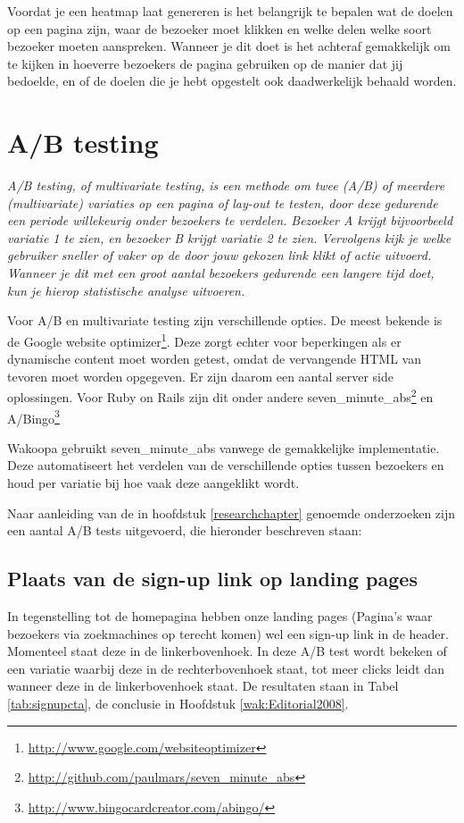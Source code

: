 \documentclass[a4paper, 10pt, pdftex]{report}
\begin{document}
    Voordat je een heatmap laat genereren is het belangrijk te bepalen wat de doelen op een pagina zijn, waar de bezoeker moet klikken en welke delen welke soort bezoeker moeten aanspreken. Wanneer je dit doet is het achteraf gemakkelijk om te kijken in hoeverre bezoekers de pagina gebruiken op de manier dat jij bedoelde, en of de doelen die je hebt opgestelt ook daadwerkelijk behaald worden.

    \section{A/B testing}
    \textit{A/B testing, of multivariate testing, is een methode om twee (A/B) of meerdere (multivariate) variaties op een pagina of lay-out te testen, door deze gedurende een periode willekeurig onder bezoekers te verdelen. Bezoeker \emph{A} krijgt bijvoorbeeld variatie 1 te zien, en bezoeker \emph{B} krijgt variatie 2 te zien. Vervolgens kijk je welke gebruiker sneller of vaker op de door jouw gekozen link klikt of actie uitvoerd. Wanneer je dit met een groot aantal bezoekers gedurende een langere tijd doet, kun je hierop statistische analyse uitvoeren.}

    Voor A/B en multivariate testing zijn verschillende opties. De meest bekende is de Google website optimizer\footnote{\url{http://www.google.com/websiteoptimizer}}. Deze zorgt echter voor beperkingen als er dynamische content moet worden getest, omdat de vervangende HTML van tevoren moet worden opgegeven. Er zijn daarom een aantal server side oplossingen. Voor Ruby on Rails zijn dit onder andere seven\_minute\_abs\footnote{\url{http://github.com/paulmars/seven\_minute\_abs}} en A/Bingo\footnote{\url{http://www.bingocardcreator.com/abingo/}}

   Wakoopa gebruikt seven\_minute\_abs vanwege de gemakkelijke implementatie. Deze automatiseert het verdelen van de verschillende opties tussen bezoekers en houd per variatie bij hoe vaak deze aangeklikt wordt.

    Naar aanleiding van de in hoofdstuk \ref{researchchapter} genoemde onderzoeken zijn een aantal A/B tests uitgevoerd, die hieronder beschreven staan:

    \subsection{Plaats van de sign-up link op landing pages}
      \label{ctatest}
      In tegenstelling tot de homepagina hebben onze landing pages (Pagina's waar bezoekers via zoekmachines op terecht komen) wel een sign-up link in de header. Momenteel staat deze in de linkerbovenhoek. In deze A/B test wordt bekeken of een variatie waarbij deze in de rechterbovenhoek staat, tot meer clicks leidt dan wanneer deze in de linkerbovenhoek staat. De resultaten staan in Tabel \ref{tab:signupcta}, de conclusie in Hoofdstuk \ref{wak:Editorial2008}.
\end{document}
